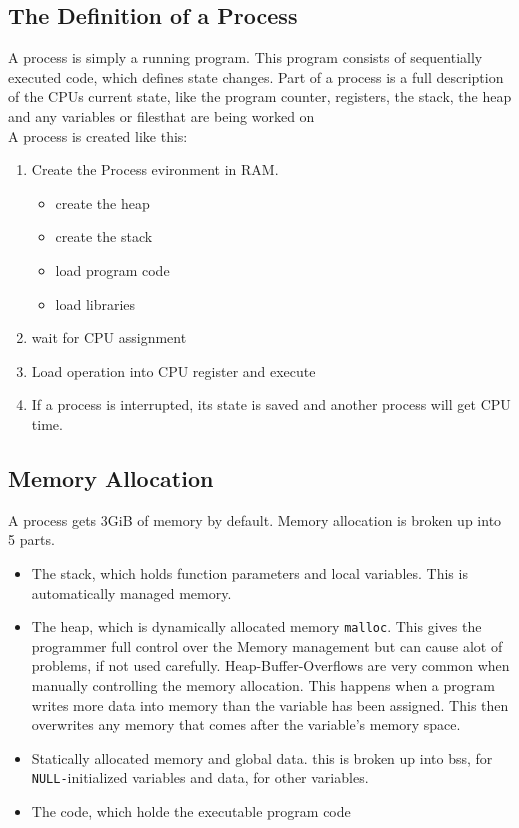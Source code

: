 \documentclass[a4paper, 11pt]{article}
\begin{document}
    \subsection{The Definition of a Process}
    A process is simply a running program. This program consists of sequentially executed code, which defines state changes.
    Part of a process is a full description of the CPUs current state, like the program counter, registers, the stack, 
    the heap and any variables or filesthat are being worked on\\
    A process is created like this:
    \begin{enumerate}
      \item Create the Process evironment in RAM.
      \begin{itemize}
        \item create the heap
        \item create the stack
        \item load program code
        \item load libraries
      \end{itemize} 
      \item wait for CPU assignment
      \item Load operation into CPU register and execute
      \item If a process is interrupted, its state is saved and another process will get CPU time.
    \end{enumerate}
    \subsection{Memory Allocation}
    A process gets 3GiB of memory by default. Memory allocation is broken up into 5 parts.
    \begin{itemize}
      \item The stack, which holds function parameters and local variables. This is automatically managed memory.
      \item The heap, which is dynamically allocated memory \texttt{malloc}. This gives the programmer full control over the Memory management
            but can cause alot of problems, if not used carefully. Heap-Buffer-Overflows are very common when manually controlling the memory
            allocation. This happens when a program writes more data into memory than the variable has been assigned. This then overwrites any 
            memory that comes after the variable's memory space.
      \item Statically allocated memory and global data. this is broken up into bss, for \lstinline{NULL-}initialized variables and data,
            for other variables.
      \item The code, which holde the executable program code
    \end{itemize}
\end{document}
